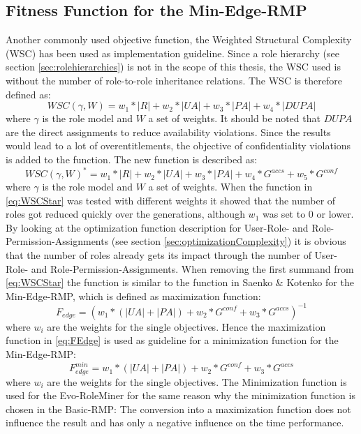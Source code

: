 		\subsection{Fitness Function for the Min-Edge-RMP}
		Another commonly used objective function, the Weighted Structural Complexity (WSC) \cite{Molloy} \cite{Xu} has been used as implementation guideline. Since a role hierarchy (see section \ref{sec:rolehierarchies}) is not in the scope of this thesis, the WSC used is without the number of role-to-role inheritance relations. The WSC is therefore defined as:
		\begin{equation}
			WSC(\gamma,W) = w_1 * |R| + w_2 * |UA| + w_3 * |PA| + w_4 * |DUPA|
		\end{equation}
		where $\gamma$ is the role model and $W$ a set of weights. It should be noted that $DUPA$ are the direct assignments to reduce availability violations. Since the results would lead to a lot of overentitlements, the objective of confidentiality violations is added to the function. The new function is described as:		
		\begin{equation}\label{eq:WSCStar}
			WSC(\gamma,W)^* = w_1 * |R| + w_2 * |UA| + w_3 * |PA| + w_4 * G^{accs} + w_5 * G^{conf}			
		\end{equation}		
		where $\gamma$ is the role model and $W$ a set of weights. When the function in \eqref{eq:WSCStar} was tested with different weights it showed that the number of roles got reduced quickly over the generations, although $w_1$ was set to 0 or lower. By looking at the optimization function description for User-Role- and Role-Permission-Assignments (see section \ref{sec:optimizationComplexity}) it is obvious that the number of roles already gets its impact through the number of User-Role- and Role-Permission-Assignments. When removing the first summand from \eqref{eq:WSCStar} the function is similar to the function in Saenko \& Kotenko\cite{Igor} for the Min-Edge-RMP, which is defined as maximization function:		
		\begin{equation}\label{eq:FEdge}
			F_{edge} = (w_1 * (|UA| + |PA|) + w_2 * G^{conf} + w_3 * G^{accs})^{-1}
		\end{equation}		
		where $w_i$ are the weights for the single objectives. Hence the maximization function in \eqref{eq:FEdge} is used as guideline for a minimization function for the Min-Edge-RMP:		
		\begin{equation}\label{eq:FEdgeMin}
			F_{edge}^{min} = w_1 * (|UA| + |PA|) + w_2 * G^{conf} + w_3 * G^{accs}
		\end{equation}		
		where $w_i$ are the weights for the single objectives. The Minimization function is used for the Evo-RoleMiner for the same reason why the minimization function is chosen in the Basic-RMP: The conversion into a maximization function does not influence the result and has only a negative influence on the time performance.
		
